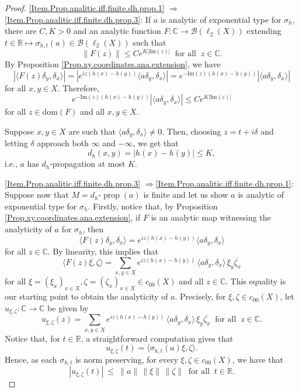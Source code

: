\documentclass[11pt]{amsart}
\newcommand{\R}{\mathbb{R}}
\newcommand{\C}{\mathbb{C}}
\newcommand{\cB}{\mathcal{B}}
\numberwithin{equation}{section}
\theoremstyle{definition}
\theoremstyle{remark}
\DeclareMathOperator{\propg}{prop}
\begin{document}
\begin{proof}
\eqref{Item.Prop.analitic.iff.finite.dh.prop.1} $\Rightarrow$\eqref{Item.Prop.analitic.iff.finite.dh.prop.3}: If $a$ is analytic of exponential type  for $\sigma_h$, there are  $C,K>0$ and an analytic function  $F\colon \C\to \cB(\ell_2(X))$ extending  $t\in \R\mapsto\sigma_{h,t}(a)\in \cB(\ell_2(X))$ such that    \[\|F(z)\|\leq Ce^{K|\mathrm{Im}(z)|}\ \text{  for all }\ z\in \C.\] By Proposition \ref{Prop.xy.coordinates.ana.extension},  we have
\[|\langle F(z)\delta_y,\delta_x\rangle|=|e^{iz (h(x)-h(y))}\langle a\delta_y,\delta_x\rangle|=e^{-\mathrm{Im}(z )(h(x)-h(y))}|\langle a\delta_y,\delta_x\rangle|\]
for all $x,y\in X$. Therefore,
\begin{equation}\label{Eq.27.aug.26.1}e^{-\mathrm{Im}(z )(h(x)-h(y))}|\langle a\delta_y,\delta_x\rangle|\leq Ce^{K|\mathrm{Im}(z)|}\end{equation}
for all $z\in \mathrm{dom}(F)$ and all $x,y\in X$.

Suppose $x,y\in X$ are such that $\langle a\delta_y,\delta_x\rangle\neq 0$. Then, choosing $z=t+i\delta$ and letting $\delta$ approach both $\infty$ and $-\infty$, we get  that
\[d_h(x,y)=|h(x)-h(y)|\leq K,\]
i.e., $a$ has $d_h$-propagation at most $K$.

\eqref{Item.Prop.analitic.iff.finite.dh.prop.3} $\Rightarrow$\eqref{Item.Prop.analitic.iff.finite.dh.prop.1}:  Suppose now that $M=d_h\text{-}\propg(a)$ is finite and let us show $a$ is analytic of exponential type for $\sigma_h$. Firstly, notice that, by Proposition \ref{Prop.xy.coordinates.ana.extension}, if $F$ is an analytic map witnessing the analyticity of $a$ for $\sigma_h$, then
\[\langle F(z)\delta_y,\delta_x\rangle=e^{iz(h(x)-h(y))}\langle a\delta_y,\delta_x\rangle\]
for all $z\in \C$.
By linearity, this implies that
\[\langle F(z)\xi,\zeta\rangle=\sum_{x,y\in X}e^{iz(h(x)-h(y))}\,\langle a\delta_y,\delta_x\rangle\,\xi_y\overline{\zeta_x}\]
for all  $\xi=(\xi_x)_{x\in X},\zeta=(\zeta_x)_{x\in X}\in c_{00}(X)$ and all $z\in \C$. This equality is our  starting point to obtain the analyticity of $a$. Precisely,  for $\xi,\zeta\in c_{00}(X)$, let  $u_{\xi,\zeta}\colon \C\to \C$ be given by
\[
u_{\xi,\zeta}(z)=\sum_{x,y\in X}e^{iz(h(x)-h(y))}\,\langle a\delta_y,\delta_x\rangle\,\xi_y\overline{\zeta_x}
\ \text{ for all }\ z\in \C.\]
 Notice that, for $t\in \R$, a straightforward computation gives that
\begin{equation}\label{Eq.19.Aug.26.tarde.1}u_{\xi,\zeta}(t)=\langle\sigma_{h,t}(a)\xi,\zeta\rangle.
\end{equation} Hence, as   each $\sigma_{h,t}$ is norm preserving,  for every $\xi,\zeta \in c_{00}(X)$, we have that
\begin{equation}\label{fix2:eq.realbound}
 |u_{\xi,\zeta}(t)|\ \le\ \|a\|\,\|\xi\|\,\|\zeta\|\ \text{ for all }\ t\in \R .
\end{equation}


\end{proof}
\end{document}
